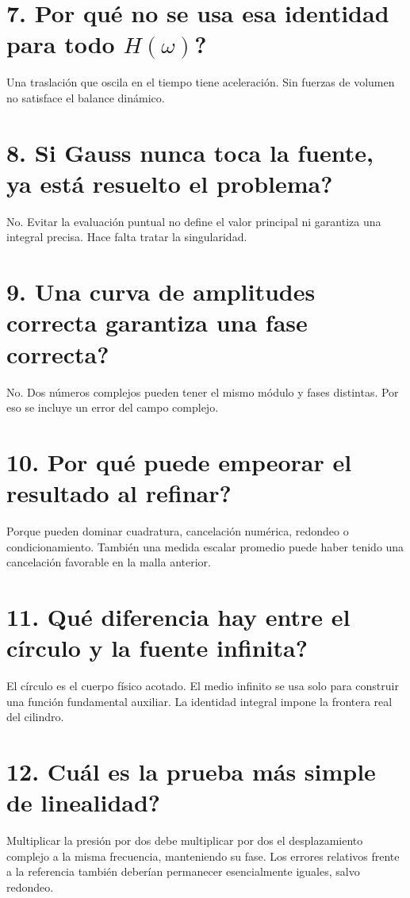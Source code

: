 \documentclass[11pt,a4paper]{report}
\numberwithin{equation}{chapter}
\begin{document}
\section*{7. Por qu\'e no se usa esa identidad para todo $H(\omega)$?}
Una traslaci\'on que oscila en el tiempo tiene aceleraci\'on.
Sin fuerzas de volumen no satisface el balance din\'amico.

\section*{8. Si Gauss nunca toca la fuente, ya est\'a resuelto el problema?}
No. Evitar la evaluaci\'on puntual no define el valor principal ni
garantiza una integral precisa. Hace falta tratar la singularidad.

\section*{9. Una curva de amplitudes correcta garantiza una fase correcta?}
No. Dos n\'umeros complejos pueden tener el mismo m\'odulo y fases
distintas. Por eso se incluye un error del campo complejo.

\section*{10. Por qu\'e puede empeorar el resultado al refinar?}
Porque pueden dominar cuadratura, cancelaci\'on num\'erica, redondeo
o condicionamiento. Tambi\'en una medida escalar promedio puede haber
tenido una cancelaci\'on favorable en la malla anterior.

\section*{11. Qu\'e diferencia hay entre el c\'irculo y la fuente infinita?}
El c\'irculo es el cuerpo f\'isico acotado. El medio infinito se usa
solo para construir una funci\'on fundamental auxiliar.
La identidad integral impone la frontera real del cilindro.

\section*{12. Cu\'al es la prueba m\'as simple de linealidad?}
Multiplicar la presi\'on por dos debe multiplicar por dos el
desplazamiento complejo a la misma frecuencia, manteniendo su fase.
Los errores relativos frente a la referencia tambi\'en deber\'ian
permanecer esencialmente iguales, salvo redondeo.
\end{document}
